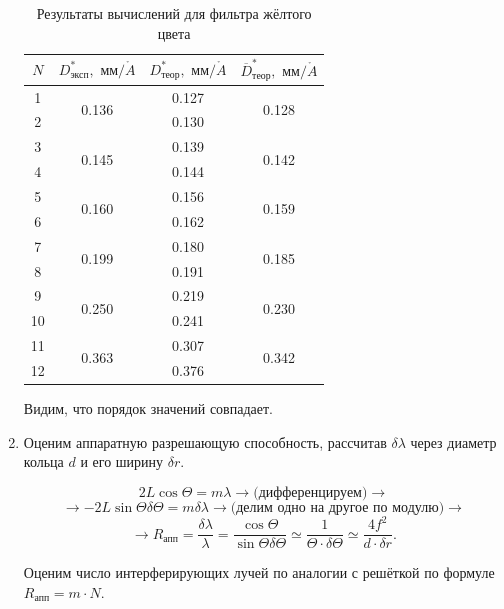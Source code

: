 \documentclass[a4paper,12pt]{article} %
\begin{document}
\begin{enumerate}
    \begin{table}[h]
        \centering
        \begin{tabular}{|c|c|c|c|}
        \hline
    	$N$ & $D^*_{\text{эксп}}, \text{ мм/}\mathring A$ & $D^*_{\text{теор}}, \text{ мм/}\mathring A$ & $\overline D^*_{\text{теор}}, \text{ мм/}\mathring A$ \\ \hline
    	1 & \multirow{2}{*}{0.136} & 0.127 & \multirow{2}{*}{0.128} \\
    	2 &  & 0.130 & \\ \hline
    	3 & \multirow{2}{*}{0.145} & 0.139 & \multirow{2}{*}{0.142} \\
    	4 &  & 0.144 & \\ \hline
    	5 & \multirow{2}{*}{0.160} & 0.156 & \multirow{2}{*}{0.159} \\
    	6 &  & 0.162 & \\ \hline
    	7 & \multirow{2}{*}{0.199} & 0.180 & \multirow{2}{*}{0.185} \\
    	8 &  & 0.191 & \\ \hline
    	9 & \multirow{2}{*}{0.250} & 0.219 & \multirow{2}{*}{0.230} \\
    	10 &  & 0.241 & \\ \hline
    	11 & \multirow{2}{*}{0.363} & 0.307 & \multirow{2}{*}{0.342} \\
    	12 &  & 0.376 & \\ \hline
        \end{tabular}
    \caption{Результаты вычислений для фильтра жёлтого цвета}
    \label{tab7}
    \end{table}

    Видим, что порядок значений совпадает.

    \newpage

    \item Оценим аппаратную разрешающую способность, рассчитав $\delta\lambda$ через диаметр кольца $d$ и его ширину $\delta r$.

    \[ 2L\cos{\Theta}=m\lambda \longrightarrow \text{(дифференцируем)} \longrightarrow \] \[ \longrightarrow -2L\sin{\Theta}\delta\Theta =m\delta\lambda \longrightarrow \text{(делим одно на другое по модулю)} \longrightarrow \] \[ \longrightarrow R_{\text{апп}} = \frac{\delta\lambda}{\lambda} = \frac{\cos{\Theta}}{\sin{\Theta}\delta\Theta} \simeq \frac{1}{\Theta\cdot\delta\Theta} \simeq \frac{4f^2}{d\cdot\delta r}. \]

    Оценим число интерферирующих лучей по аналогии с решёткой по формуле $R_{\text{апп}}=m\cdot N$.


\end{enumerate}
\end{document}

